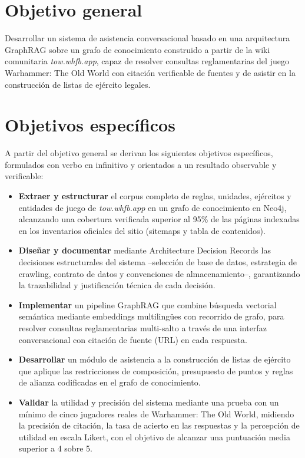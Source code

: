 \documentclass[11pt,a4paper,spanish]{book}
\numberwithin{equation}{chapter}
\numberwithin{figure}{chapter}
\numberwithin{table}{chapter}
\begin{document}
\section{Objetivo general}

Desarrollar un sistema de asistencia conversacional basado en una arquitectura GraphRAG sobre un grafo de conocimiento construido a partir de la wiki comunitaria \emph{tow.whfb.app}, capaz de resolver consultas reglamentarias del juego Warhammer: The Old World con citación verificable de fuentes y de asistir en la construcción de listas de ejército legales.

\section{Objetivos específicos}

A partir del objetivo general se derivan los siguientes objetivos específicos, formulados con verbo en infinitivo y orientados a un resultado observable y verificable:

\begin{itemize}
	\item \textbf{Extraer y estructurar} el corpus completo de reglas, unidades, ejércitos y entidades de juego de \emph{tow.whfb.app} en un grafo de conocimiento en Neo4j, alcanzando una cobertura verificada superior al 95\% de las páginas indexadas en los inventarios oficiales del sitio (sitemaps y tabla de contenidos).
	\item \textbf{Diseñar y documentar} mediante Architecture Decision Records las decisiones estructurales del sistema --selección de base de datos, estrategia de crawling, contrato de datos y convenciones de almacenamiento--, garantizando la trazabilidad y justificación técnica de cada decisión.
	\item \textbf{Implementar} un pipeline GraphRAG que combine búsqueda vectorial semántica mediante embeddings multilingües con recorrido de grafo, para resolver consultas reglamentarias multi-salto a través de una interfaz conversacional con citación de fuente (URL) en cada respuesta.
	\item \textbf{Desarrollar} un módulo de asistencia a la construcción de listas de ejército que aplique las restricciones de composición, presupuesto de puntos y reglas de alianza codificadas en el grafo de conocimiento.
	\item \textbf{Validar} la utilidad y precisión del sistema mediante una prueba con un mínimo de cinco jugadores reales de Warhammer: The Old World, midiendo la precisión de citación, la tasa de acierto en las respuestas y la percepción de utilidad en escala Likert, con el objetivo de alcanzar una puntuación media superior a 4 sobre 5.
\end{itemize}
\end{document}
